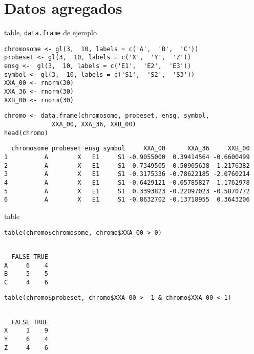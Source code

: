 \documentclass[xcolor={usenames,svgnames,dvipsnames}]{beamer}
\begin{document}
\section{Datos agregados}
\label{sec-3}
\begin{frame}[fragile,label=sec-3-1]{table, \texttt{data.frame} de ejemplo}
 \lstset{language=R,numbers=none}
\begin{lstlisting}
chromosome <- gl(3,  10, labels = c('A',  'B',  'C'))
probeset <- gl(3,  10, labels = c('X',  'Y',  'Z'))
ensg <-  gl(3,  10, labels = c('E1',  'E2',  'E3'))
symbol <- gl(3,  10, labels = c('S1',  'S2',  'S3'))
XXA_00 <- rnorm(30)
XXA_36 <- rnorm(30)
XXB_00 <- rnorm(30)
\end{lstlisting}

\lstset{language=R,numbers=none}
\begin{lstlisting}
chromo <- data.frame(chromosome, probeset, ensg, symbol,
		     XXA_00, XXA_36, XXB_00)
head(chromo)
\end{lstlisting}

\begin{verbatim}
  chromosome probeset ensg symbol     XXA_00      XXA_36     XXB_00
1          A        X   E1     S1 -0.9055000  0.39414564 -0.6600499
2          A        X   E1     S1 -0.7349505  0.50905638 -1.2176382
3          A        X   E1     S1 -0.3175336 -0.78622185 -2.0760214
4          A        X   E1     S1 -0.6429121 -0.05785827  1.1762978
5          A        X   E1     S1  0.3393823 -0.22097023 -0.5870772
6          A        X   E1     S1 -0.8632702 -0.13718955  0.3643206
\end{verbatim}
\end{frame}
\begin{frame}[fragile,label=sec-3-2]{table}
 \lstset{language=R,numbers=none}
\begin{lstlisting}
table(chromo$chromosome, chromo$XXA_00 > 0)
\end{lstlisting}

\begin{verbatim}
 
  FALSE TRUE
A     6    4
B     5    5
C     4    6
\end{verbatim}

\lstset{language=R,numbers=none}
\begin{lstlisting}
table(chromo$probeset, chromo$XXA_00 > -1 & chromo$XXA_00 < 1)
\end{lstlisting}

\begin{verbatim}
 
  FALSE TRUE
X     1    9
Y     6    4
Z     4    6
\end{verbatim}
\end{frame}
\end{document}
